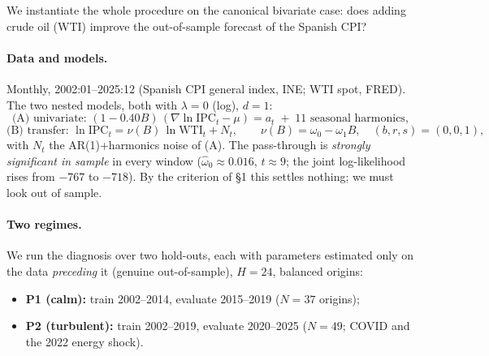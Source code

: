 \documentclass[11pt]{article}
\begin{document}
We instantiate the whole procedure on the canonical bivariate case: does adding
crude oil (WTI) improve the out-of-sample forecast of the Spanish CPI?

\paragraph{Data and models.}
Monthly, 2002:01--2025:12 (Spanish CPI general index, INE; WTI spot, FRED). The two
nested models, both with $\lambda=0$ (log), $d=1$:
\[
\text{(A) univariate: } (1-0.40B)\,(\nabla\ln\mathrm{IPC}_t-\mu)=a_t
\;+\;\text{11 seasonal harmonics},
\]
\[
\text{(B) transfer: } \ln\mathrm{IPC}_t=\nu(B)\,\ln\mathrm{WTI}_t+N_t,
\qquad \nu(B)=\omega_0-\omega_1B,\quad(b,r,s)=(0,0,1),
\]
with $N_t$ the AR(1)+harmonics noise of (A). The pass-through is \emph{strongly
significant in sample} in every window ($\hat\omega_0\approx0.016$, $t\approx9$; the
joint log-likelihood rises from $-767$ to $-718$). By the criterion of \S1 this settles
nothing; we must look out of sample.

\paragraph{Two regimes.}
We run the diagnosis over two hold-outs, each with parameters estimated only on the
data \emph{preceding} it (genuine out-of-sample), $H=24$, balanced origins:
\begin{itemize}\itemsep0pt
\item \textbf{P1 (calm):} train 2002--2014, evaluate 2015--2019 ($N=37$ origins);
\item \textbf{P2 (turbulent):} train 2002--2019, evaluate 2020--2025 ($N=49$; COVID and
      the 2022 energy shock).
\end{itemize}
\end{document}
